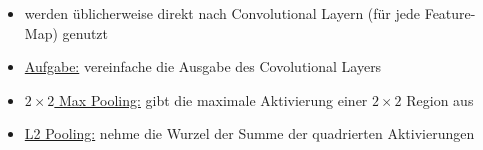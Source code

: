 \begin{itemize}
\begin{enumerate}
    \begin{itemize}
      \item werden üblicherweise direkt nach Convolutional Layern (für jede Feature-Map) genutzt
      \item \underline{Aufgabe:} vereinfache die Ausgabe  des Covolutional Layers
      \item \underline{$2 \times 2$ Max Pooling:} gibt die maximale Aktivierung einer $2 \times 2$ Region aus
      \item \underline{L2 Pooling:} nehme die Wurzel der Summe der quadrierten Aktivierungen
    \end{itemize}
  \end{enumerate}
\end{itemize}
